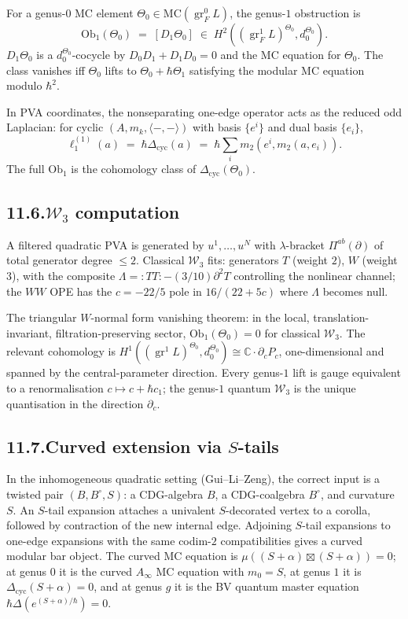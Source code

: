 \documentclass[11pt,reqno]{amsart}
\theoremstyle{definition}
\theoremstyle{remark}
\providecommand{\cW}{\mathcal{W}}
\providecommand{\MC}{\mathrm{MC}}
\providecommand{\bC}{\mathbb{C}}
\providecommand{\Ob}{\mathrm{Ob}}
\DeclareMathOperator{\gr}{gr}
\numberwithin{equation}{section}
\begin{document}
For a genus-$0$ MC element
$\Theta_0 \in \MC(\gr_F^0 L)$, the genus-$1$ obstruction is
\[
\Ob_1(\Theta_0)
\;=\;
[D_1 \Theta_0]
\;\in\;
H^2((\gr_F^1 L)^{\Theta_0}, d_0^{\Theta_0}).
\]
$D_1\Theta_0$ is a $d_0^{\Theta_0}$-cocycle by
$D_0 D_1 + D_1 D_0 = 0$ and the MC equation for $\Theta_0$.
The class vanishes iff $\Theta_0$ lifts to
$\Theta_0 + \hbar\Theta_1$ satisfying the modular MC equation
modulo $\hbar^2$.

In PVA coordinates, the nonseparating one-edge operator acts
as the reduced odd Laplacian: for cyclic $(A, m_k, \langle-,-\rangle)$
with basis $\{e^i\}$ and dual basis $\{e_i\}$,
\[
\ell_1^{(1)}(a)
\;=\;
\hbar\Delta_{\mathrm{cyc}}(a)
\;=\;
\hbar\sum_i m_2(e^i, m_2(a, e_i)).
\]
The full $\Ob_1$ is the cohomology class of
$\Delta_{\mathrm{cyc}}(\Theta_0)$.

\subsection*{11.6.\enspace $\cW_3$ computation}

A filtered quadratic PVA is generated by $u^1, \ldots, u^N$ with
$\lambda$-bracket $\Pi^{ab}(\partial)$ of total generator degree
$\le 2$. Classical $\cW_3$ fits: generators $T$ (weight $2$),
$W$ (weight $3$), with the composite
$\Lambda = :TT: - (3/10)\partial^2 T$ controlling the nonlinear
channel; the $WW$ OPE has the $c = -22/5$ pole in
$16/(22 + 5c)$ where $\Lambda$ becomes null.

The triangular $W$-normal form vanishing theorem: in the local,
translation-invariant, filtration-preserving sector,
$\Ob_1(\Theta_0) = 0$ for classical $\cW_3$. The relevant
cohomology is
$H^1((\gr^1 L)^{\Theta_0}, d_0^{\Theta_0})
\cong \bC\cdot\partial_c P_c$,
one-dimensional and spanned by the central-parameter direction.
Every genus-$1$ lift is gauge equivalent to a renormalisation
$c \mapsto c + \hbar c_1$; the genus-$1$ quantum $\cW_3$ is the
unique quantisation in the direction $\partial_c$.

\subsection*{11.7.\enspace Curved extension via $S$-tails}

In the inhomogeneous quadratic setting (Gui--Li--Zeng), the
correct input is a twisted pair $(B, B^\circ, S)$: a
CDG-algebra $B$, a CDG-coalgebra $B^\circ$, and curvature $S$.
An $S$-tail expansion attaches a univalent $S$-decorated vertex
to a corolla, followed by contraction of the new internal edge.
Adjoining $S$-tail expansions to one-edge expansions with the
same codim-$2$ compatibilities gives a curved modular bar
object. The curved MC equation is
$\mu((S + \alpha) \boxtimes (S + \alpha)) = 0$; at genus $0$
it is the curved $A_\infty$ MC equation with $m_0 = S$, at
genus $1$ it is $\Delta_{\mathrm{cyc}}(S + \alpha) = 0$, and
at genus $g$ it is the BV quantum master equation
$\hbar\Delta(e^{(S+\alpha)/\hbar}) = 0$.
\end{document}
